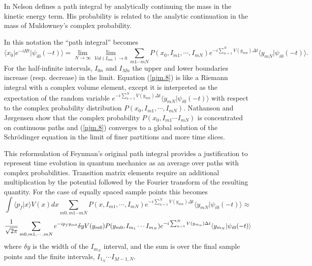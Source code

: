 \documentclass[aps,prc,reprint,noshowpacs,groupedaddress,onecolumn]{revtex4}
\def\beq{\begin{equation}}
\def\eeq{\end{equation}}
\begin{document}
In \cite{Nelson} Nelson defines a path integral by
analytically continuing the mass in the kinetic energy term.  His
probability is related to the analytic continuation in the mass 
of Muldowney's complex probability.

In this notation the ``path integral'' becomes
\beq
\langle x_0 \vert e^{-iHt} \vert \psi_{i0}(-t) \rangle = 
\lim_{N\to \infty} \lim_{Vol(I_{mn})\to 0}
\sum_{m1 \cdots mN}  P(x_0, I_{m1}, \cdots ,I_{mN})
e^{
-i \sum_{n=1}^{N} V(y_{mn}) \Delta t }
\langle y_{mN} \vert \psi_{i0} (-t)\rangle . 
\label{njm.8}
\eeq
For the half-infinite intervals, $I_{0n}$ and $I_{Mn}$ the upper and
lower boundaries increase (resp. decrease) in the limit.  
Equation
(\ref{njm.8}) is like a Riemann integral with a complex volume element,
except it is interpreted as the expectation of the
random variable
$ e^{ -i \sum_{n=1}^{N} V(y_{mn}) \Delta t }
\langle y_{mN} \vert \psi_{i0} (-t)\rangle$ with
respect to the complex probability distribution
$P(x_0,I_{m1}, \cdots ,I_{mN})$.  Nathanson and J{\o}rgensen show that
the complex probability $P(x_0,I_{m1} \cdots I_{mN})$ is concentrated
on continuous paths and (\ref{njm.8}) converges to a global solution of the
Schr\"odinger equation in the limit of finer partitions and more time
slices.  

This reformulation of Feynman's original path integral provides a
justification to represent time evolution in
quantum mechanics as an average over paths
with complex probabilities.
Transition matrix elements
require an additional multiplication by the potential followed by the
Fourier transform of the resulting quantity.  For the case of equally
spaced sample points this becomes
\[
\int \langle p_f \vert x \rangle V(x) dx 
\sum_{m0,m1 \cdots mN} P(x,I_{m1}, \cdots , I_{mN})
e^{
-i \sum_{n=1}^{N} V(y_{mn}) \Delta t }
\langle y_{mN} \vert \psi_{i0} (-t)\rangle 
\approx
\]
\beq
{1 \over \sqrt{2 \pi}} \sum_{m0, m1, \cdots , mN} e^{-ip_f y_{m0}} \delta y
V(y_{m0}) P(y_{m0},I_{m_1} \cdots I_{m_N}) e^{ -i \sum_{n=1}^{N} V(y_{m_n}) \Delta t }
\langle y_{m_N} \vert \psi_{i0} (-t)\rangle 
\label{njm.9}
\eeq
where $\delta y$ is the width of the $I_{m_N}$ interval, and the 
sum is over the final sample points and the finite intervals, $I_{1_N} 
\cdots I_{M-1,N}$.
\end{document}
